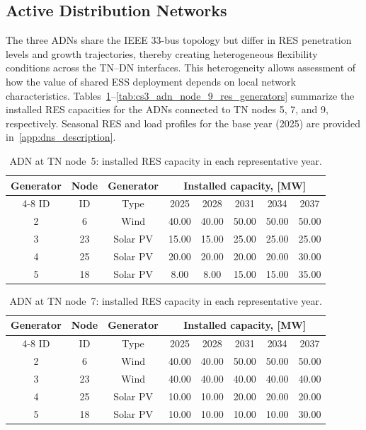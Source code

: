 \documentclass[preprint,12pt]{elsarticle}
\begin{document}
\subsection{Active Distribution Networks}
\label{subsec:case_study_adns}

The three ADNs share the IEEE 33-bus topology but differ in RES penetration levels and growth trajectories, thereby creating heterogeneous flexibility conditions across the TN--DN interfaces. This heterogeneity allows assessment of how the value of shared ESS deployment depends on local network characteristics. Tables~\ref{tab:cs3_adn_node_5_res_generators}--\ref{tab:cs3_adn_node_9_res_generators} summarize the installed RES capacities for the ADNs connected to TN nodes 5, 7, and 9, respectively. Seasonal RES and load profiles for the base year (2025) are provided in~\ref{app:dns_description}.

\begin{table}[htbp!]
    \centering
    \caption{ADN at TN node~5: installed RES capacity in each representative year.}
    \begin{tabular}{ccc ccccc}
        \toprule
        Generator   & Node  & Generator & \multicolumn{5}{c}{Installed capacity, [MW]}\\  \cmidrule{4-8}
        ID          & ID    & Type      & 2025  & 2028  & 2031  & 2034   & 2037 \\ 
        \midrule
        2 & 6  &  Wind    & 40.00 & 40.00 & 50.00 & 50.00 & 50.00\\
        3 & 23 & Solar PV & 15.00 & 15.00 & 25.00 & 25.00 & 25.00\\
        4 & 25 & Solar PV & 20.00 & 20.00 & 20.00 & 20.00 & 30.00\\
        5 & 18 & Solar PV & 8.00  & 8.00  & 15.00 & 15.00 & 35.00\\
        \bottomrule
    \end{tabular}
    \label{tab:cs3_adn_node_5_res_generators}
\end{table}

\begin{table}[htbp!]
    \centering
    \caption{ADN at TN node~7: installed RES capacity in each representative year.}
    \begin{tabular}{ccc ccccc}
        \toprule
        Generator   & Node  & Generator & \multicolumn{5}{c}{Installed capacity, [MW]}\\  \cmidrule{4-8}
        ID          & ID    & Type      & 2025  & 2028  & 2031  & 2034   & 2037 \\ 
        \midrule
        2 & 6  & Wind     & 40.00 & 40.00 & 50.00 & 50.00 & 50.00\\
        3 & 23 & Wind     & 40.00 & 40.00 & 40.00 & 40.00 & 40.00\\
        4 & 25 & Solar PV & 10.00 & 10.00 & 20.00 & 20.00 & 20.00\\
        5 & 18 & Solar PV & 10.00 & 10.00 & 10.00 & 10.00 & 30.00\\
        \bottomrule
    \end{tabular}
    \label{tab:cs3_adn_node_7_res_generators}
\end{table}
\end{document}
